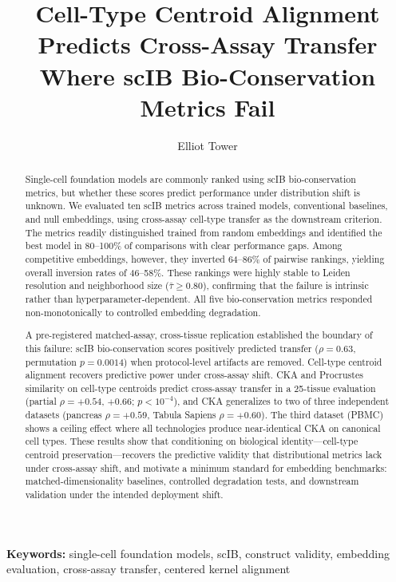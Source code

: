\documentclass[11pt]{article}
\title{Cell-Type Centroid Alignment Predicts Cross-Assay Transfer\\Where scIB Bio-Conservation Metrics Fail}
\author{Elliot Tower}
\affil{Independent Researcher \\ \texttt{elliot@elliottower.ai}}
\date{}
\begin{document}
\linenumbers
\maketitle

\begin{abstract}
Single-cell foundation models are commonly ranked using scIB
bio-conservation metrics, but whether these scores predict performance
under distribution shift is unknown. We evaluated ten scIB metrics
across trained models, conventional baselines, and null embeddings,
using cross-assay cell-type transfer as the downstream criterion.
The metrics readily distinguished trained from random embeddings and
identified the best model in 80--100\% of comparisons with clear
performance gaps. Among competitive embeddings, however, they inverted
64--86\% of pairwise rankings, yielding overall inversion rates of
46--58\%. These rankings were highly stable to Leiden resolution and
neighborhood size ($\bar{\tau} \geq 0.80$), confirming that the failure
is intrinsic rather than hyperparameter-dependent. All five
bio-conservation metrics responded non-monotonically to controlled
embedding degradation.

A pre-registered matched-assay, cross-tissue replication established
the boundary of this failure: scIB bio-conservation scores positively
predicted transfer ($\rho = 0.63$, permutation $p = 0.0014$) when
protocol-level artifacts are removed. Cell-type centroid alignment
recovers predictive power under cross-assay shift. CKA and Procrustes
similarity on cell-type centroids predict cross-assay transfer in a
25-tissue evaluation (partial $\rho = +0.54$, $+0.66$;
$p < 10^{-4}$), and CKA generalizes to two of three independent
datasets (pancreas $\rho = +0.59$, Tabula Sapiens $\rho = +0.60$).
The third dataset (PBMC) shows a ceiling effect where all technologies
produce near-identical CKA on canonical cell types. These results
show that conditioning on biological identity---cell-type centroid
preservation---recovers the predictive validity that distributional
metrics lack under cross-assay shift, and motivate a minimum standard
for embedding benchmarks: matched-dimensionality baselines, controlled
degradation tests, and downstream validation under the intended
deployment shift.
\end{abstract}

\noindent\textbf{Keywords:} single-cell foundation models, scIB, construct validity, embedding evaluation, cross-assay transfer, centered kernel alignment
\end{document}
